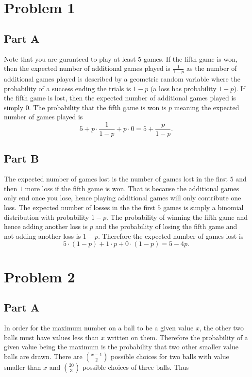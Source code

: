 \documentclass{eeleyes}
\begin{document}
\section*{Problem 1}
\subsection*{Part A}
Note that you are guranteed to play at least $5$ games. If the fifth game is won, then the expected number of additional games played is $\frac{1}{1-p}$ as the number of additional games played is described by a geometric random variable where the probability of a success ending the trials is $1-p$ (a loss has probability $1-p$). If the fifth game is lost, then the expected number of additional games played is simply $0$. The probability that the fifth game is won is $p$ meaning the expected number of games played is 
\[
    5 + p \cdot \frac{1}{1-p} + p \cdot 0 = 5 + \frac{p}{1-p}
.\]

\subsection*{Part B}
The expected number of games lost is the number of games lost in the first $5$ and then $1$ more loss if the fifth game is won. That is because the additional games only end once you lose, hence playing additional games will only contribute one loss. The expected number of losses in the the first $5$ games is simply a binomial distribution with probability $1-p$. The probability of winning the fifth game and hence adding another loss is $p$ and the probability of losing the fifth game and not adding another loss is $1-p$. Therefore the expected number of games lost is
\[
    5 \cdot (1-p) + 1 \cdot p + 0 \cdot (1 - p) = 5 - 4p
.\]


\section*{Problem 2}
\subsection*{Part A}
In order for the maximum number on a ball to be a given value $x$, the other two balls must have values less than $x$ written on them. Therefore the probability of a given value being the maximum is the probability that two other smaller value balls are drawn. There are $\binom{x-1}{2}$ possible choices for two balls with value smaller than $x$ and $\binom{20}{3}$ possible choices of three balls. Thus
\end{document}
